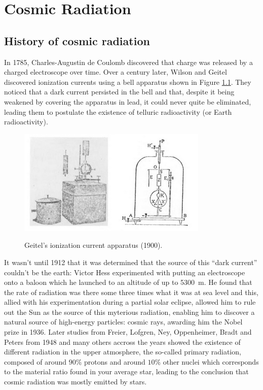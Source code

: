 
\chapter{Cosmic Radiation}

\section{History of cosmic radiation}

In 1785, Charles-Augustin de Coulomb discovered that charge was released by a charged electroscope over time. Over a century later, Wilson and Geitel discovered ionization currents using a bell apparatus shown in Figure \ref{fig:bell}. They noticed that a dark current persisted in the bell and that, despite it being weakened by covering the apparatus in lead, it could never quite be eliminated, leading them to postulate the existence of telluric radioactivity (or Earth radioactivity).

\begin{figure}[htbp]
\centering
\includegraphics[width=0.6\linewidth]{./fig/bell.png}
\label{fig:bell}
\caption{Geitel's ionization current apparatus (1900).}
\end{figure}

It wasn't until 1912 that it was determined that the source of this ``dark current'' couldn't be the earth: Victor Hess experimented with putting an electroscope onto a baloon which he launched to an altitude of up to \SI{5300}{\meter}. He found that the rate of radiation was there some three times what it was at sea level and this, allied with his experimentation during a partial solar eclipse, allowed him to rule out the Sun as the source of this myterious radiation, enabling him to discover a natural source of high-energy particles: cosmic rays, awarding him the Nobel prize in 1936. Later studies from Freier, Lofgren, Ney, Oppenheimer, Bradt and Peters from 1948 and many others accross the years showed the existence of different radiation in the upper atmosphere, the so-called primary radiation, composed of around $90\%$ protons and around $10\%$ other nuclei which corresponds to the material ratio found in your average star, leading to the conclusion that cosmic radiation was mostly emitted by stars.

